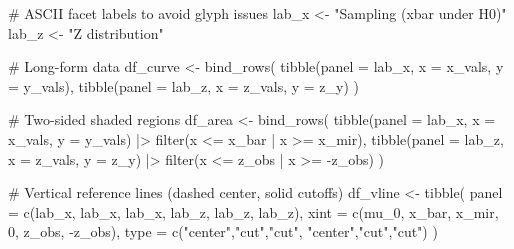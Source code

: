 \documentclass[
  letterpaper,
  DIV=11,
  numbers=noendperiod]{scrreprt}
\newenvironment{Shaded}{\begin{snugshade}}{\end{snugshade}}
\newcommand{\AttributeTok}[1]{\textcolor[rgb]{0.40,0.45,0.13}{#1}}
\newcommand{\CommentTok}[1]{\textcolor[rgb]{0.37,0.37,0.37}{#1}}
\newcommand{\DecValTok}[1]{\textcolor[rgb]{0.68,0.00,0.00}{#1}}
\newcommand{\FunctionTok}[1]{\textcolor[rgb]{0.28,0.35,0.67}{#1}}
\newcommand{\NormalTok}[1]{\textcolor[rgb]{0.00,0.23,0.31}{#1}}
\newcommand{\OtherTok}[1]{\textcolor[rgb]{0.00,0.23,0.31}{#1}}
\newcommand{\SpecialCharTok}[1]{\textcolor[rgb]{0.37,0.37,0.37}{#1}}
\newcommand{\StringTok}[1]{\textcolor[rgb]{0.13,0.47,0.30}{#1}}
\begin{document}
\begin{Shaded}
\begin{Highlighting}[]
\CommentTok{\# ASCII facet labels to avoid glyph issues}
\NormalTok{lab\_x  }\OtherTok{\textless{}{-}} \StringTok{"Sampling (xbar under H0)"}
\NormalTok{lab\_z  }\OtherTok{\textless{}{-}} \StringTok{"Z distribution"}

\CommentTok{\# Long{-}form data}
\NormalTok{df\_curve }\OtherTok{\textless{}{-}} \FunctionTok{bind\_rows}\NormalTok{(}
  \FunctionTok{tibble}\NormalTok{(}\AttributeTok{panel =}\NormalTok{ lab\_x, }\AttributeTok{x =}\NormalTok{ x\_vals, }\AttributeTok{y =}\NormalTok{ y\_vals),}
  \FunctionTok{tibble}\NormalTok{(}\AttributeTok{panel =}\NormalTok{ lab\_z, }\AttributeTok{x =}\NormalTok{ z\_vals, }\AttributeTok{y =}\NormalTok{ z\_y)}
\NormalTok{)}

\CommentTok{\# Two{-}sided shaded regions}
\NormalTok{df\_area }\OtherTok{\textless{}{-}} \FunctionTok{bind\_rows}\NormalTok{(}
  \FunctionTok{tibble}\NormalTok{(}\AttributeTok{panel =}\NormalTok{ lab\_x, }\AttributeTok{x =}\NormalTok{ x\_vals, }\AttributeTok{y =}\NormalTok{ y\_vals) }\SpecialCharTok{|\textgreater{}}
    \FunctionTok{filter}\NormalTok{(x }\SpecialCharTok{\textless{}=}\NormalTok{ x\_bar }\SpecialCharTok{|}\NormalTok{ x }\SpecialCharTok{\textgreater{}=}\NormalTok{ x\_mir),}
  \FunctionTok{tibble}\NormalTok{(}\AttributeTok{panel =}\NormalTok{ lab\_z, }\AttributeTok{x =}\NormalTok{ z\_vals, }\AttributeTok{y =}\NormalTok{ z\_y) }\SpecialCharTok{|\textgreater{}}
    \FunctionTok{filter}\NormalTok{(x }\SpecialCharTok{\textless{}=}\NormalTok{ z\_obs }\SpecialCharTok{|}\NormalTok{ x }\SpecialCharTok{\textgreater{}=} \SpecialCharTok{{-}}\NormalTok{z\_obs)}
\NormalTok{)}

\CommentTok{\# Vertical reference lines (dashed center, solid cutoffs)}
\NormalTok{df\_vline }\OtherTok{\textless{}{-}} \FunctionTok{tibble}\NormalTok{(}
  \AttributeTok{panel =} \FunctionTok{c}\NormalTok{(lab\_x, lab\_x, lab\_x,  lab\_z,  lab\_z,  lab\_z),}
  \AttributeTok{xint  =} \FunctionTok{c}\NormalTok{(mu\_0, x\_bar, x\_mir,   }\DecValTok{0}\NormalTok{,      z\_obs,  }\SpecialCharTok{{-}}\NormalTok{z\_obs),}
  \AttributeTok{type  =} \FunctionTok{c}\NormalTok{(}\StringTok{"center"}\NormalTok{,}\StringTok{"cut"}\NormalTok{,}\StringTok{"cut"}\NormalTok{, }\StringTok{"center"}\NormalTok{,}\StringTok{"cut"}\NormalTok{,}\StringTok{"cut"}\NormalTok{)}
\NormalTok{)}


\end{Highlighting}
\end{Shaded}
\end{document}
